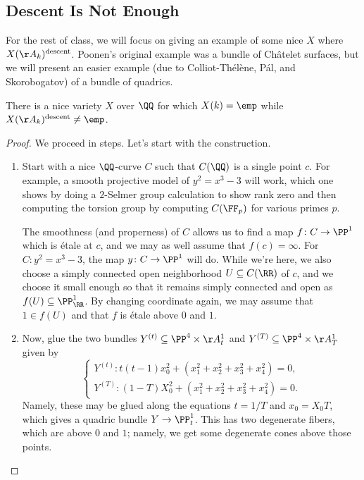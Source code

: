 \documentclass[../notes.tex]{subfiles}
\begin{document}
\subsection{Descent Is Not Enough}
For the rest of class, we will focus on giving an example of some nice $X$ where $X(\AA_k)^{\mathrm{descent}}$. Poonen's original example was a bundle of Ch\^atelet surfaces, but we will present an easier example (due to Colliot-Th\'el\`ene, P\'al, and Skorobogatov) of a bundle of quadrics.
\begin{theorem}
	There is a nice variety $X$ over $\QQ$ for which $X(k)=\emp$ while $X(\AA_k)^{\mathrm{descent}}\ne\emp$.
\end{theorem}
\begin{proof}
	We proceed in steps. Let's start with the construction.
	\begin{enumerate}
		\item Start with a nice $\QQ$-curve $C$ such that $C(\QQ)$ is a single point $c$. For example, a smooth projective model of $y^2=x^3-3$ will work, which one shows by doing a $2$-Selmer group calculation to show rank zero and then computing the torsion group by computing $C(\FF_p)$ for various primes $p$.

		The smoothness (and properness) of $C$ allows us to find a map $f\colon C\to\PP^1$ which is \'etale at $c$, and we may as well assume that $f(c)=\infty$. For $C\colon y^2=x^3-3$, the map $y\colon C\to\PP^1$ will do. While we're here, we also choose a simply connected open neighborhood $U\subseteq C(\RR)$ of $c$, and we choose it small enough so that it remains simply connected and open as $f(U)\subseteq\PP^1_\RR$. By changing coordinate again, we may assume that $1\in f(U)$ and that $f$ is \'etale above $0$ and $1$.

		\item Now, glue the two bundles $Y^{(t)}\subseteq\PP^4\times\AA^1_t$ and $Y^{(T)}\subseteq\PP^4\times\AA^1_T$ given by
		\[\begin{cases}
			Y^{(t)}\colon t(t-1)x_0^2+\left(x_1^2+x_2^2+x_3^2+x_4^2\right)=0, \\
			Y^{(T)}\colon (1-T)X_0^2+\left(x_1^2+x_2^2+x_3^2+x_4^2\right)=0.
		\end{cases}\]
		Namely, these may be glued along the equations $t=1/T$ and $x_0=X_0T$, which gives a quadric bundle $Y\to\PP^1_{t}$. This has two degenerate fibers, which are above $0$ and $1$; namely, we get some degenerate cones above those points.


\end{enumerate}
\end{proof}
\end{document}
